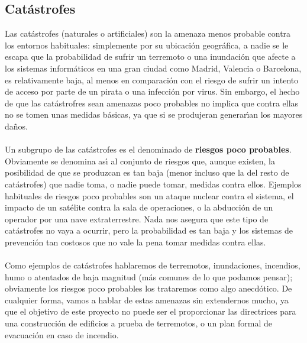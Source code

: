 \subsection{Cat\'astrofes}
Las cat\'astrofes (naturales o artificiales) son la amenaza menos probable 
contra los entornos habituales: simplemente por su ubicaci\'on geogr\'afica, a 
nadie se le escapa
que la probabilidad de sufrir un terremoto o una inundaci\'on que afecte a los
sistemas inform\'aticos en una gran ciudad como Madrid, Valencia o Barcelona, 
es 
relativamente baja, al menos en comparaci\'on con el riesgo de sufrir un intento
de acceso por parte de un pirata o una infecci\'on por virus.
Sin embargo, el hecho de que las cat\'astrofres sean amenazas poco probables
no implica que contra ellas no se tomen unas medidas b\'asicas, ya que si se
produjeran generar\'{\i}an los mayores da\~nos.\\
\\Un subgrupo de las cat\'astrofes es el denominado de {\bf riesgos poco 
probables}. Obviamente se denomina as\'{\i} al conjunto de riesgos que, aunque
existen, la posibilidad de que se produzcan es tan baja (menor incluso que la 
del resto de cat\'astrofes) que nadie toma, o nadie puede tomar, medidas 
contra ellos. Ejemplos
habituales de riesgos poco probables son un ataque nuclear contra el sistema,
el impacto de un sat\'elite contra la sala de operaciones, o la abducci\'on de
un operador por una nave extraterrestre. Nada nos asegura que este tipo de
cat\'astrofes no vaya a ocurrir, pero la probabilidad es tan baja y los sistemas
de prevenci\'on tan costosos que no vale la pena tomar medidas contra ellas.\\
\\Como ejemplos de cat\'astrofes hablaremos de terremotos, inundaciones, 
incendios, humo o atentados de baja magnitud (m\'as comunes de lo que podamos
pensar);
obviamente los riesgos poco probables los trataremos como algo anecd\'otico. De
cualquier forma, vamos a hablar de estas amenazas sin extendernos mucho, ya que 
el objetivo de este proyecto no puede ser el proporcionar las directrices 
para una construcci\'on de edificios a prueba de terremotos, o un plan formal 
de evacuaci\'on en caso de incendio.
